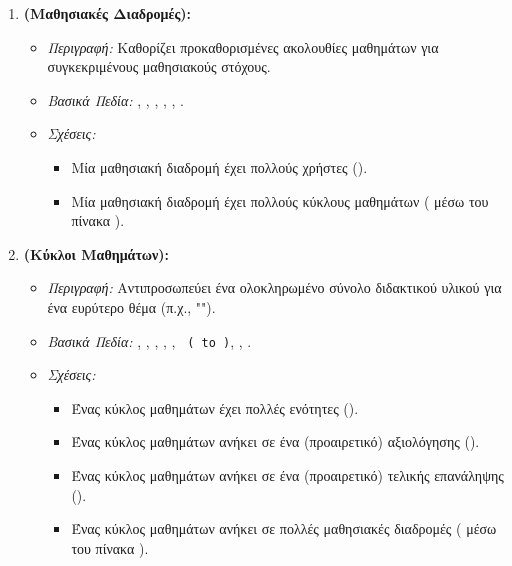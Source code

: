 \begin{enumerate}[leftmargin=*, label=\arabic*., wide, labelwidth=!, labelindent=0pt, itemsep=1ex]
    \item \textbf{\texttt{} (Μαθησιακές Διαδρομές):}
        \begin{itemize}[leftmargin=1.5em, noitemsep]
            \item \textit{Περιγραφή:} Καθορίζει προκαθορισμένες ακολουθίες μαθημάτων για συγκεκριμένους μαθησιακούς στόχους.
            \item \textit{Βασικά Πεδία:} \texttt{}, \texttt{}, \texttt{}, \texttt{}, \texttt{}, \texttt{}.
            \item \textit{Σχέσεις:}
            \begin{itemize}[leftmargin=1.5em, noitemsep]
                \item Μία μαθησιακή διαδρομή έχει πολλούς χρήστες ().
                \item Μία μαθησιακή διαδρομή έχει πολλούς κύκλους μαθημάτων ( μέσω του πίνακα \texttt{}).
            \end{itemize}
        \end{itemize}

    \item \textbf{\texttt{} (Κύκλοι Μαθημάτων):}
        \begin{itemize}[leftmargin=1.5em, noitemsep]
            \item \textit{Περιγραφή:} Αντιπροσωπεύει ένα ολοκληρωμένο σύνολο διδακτικού υλικού για ένα ευρύτερο θέμα (π.χ., "").
            \item \textit{Βασικά Πεδία:} \texttt{}, \texttt{}, \texttt{}, \texttt{}, \texttt{}, \texttt{ ( to )}, \texttt{}, \texttt{}.
            \item \textit{Σχέσεις:}
            \begin{itemize}[leftmargin=1.5em, noitemsep]
                \item Ένας κύκλος μαθημάτων έχει πολλές ενότητες ().
                \item Ένας κύκλος μαθημάτων ανήκει σε ένα (προαιρετικό)  αξιολόγησης ().
                \item Ένας κύκλος μαθημάτων ανήκει σε ένα (προαιρετικό)  τελικής επανάληψης ().
                \item Ένας κύκλος μαθημάτων ανήκει σε πολλές μαθησιακές διαδρομές ( μέσω του πίνακα \texttt{}).
            \end{itemize}
        \end{itemize}


\end{enumerate}

